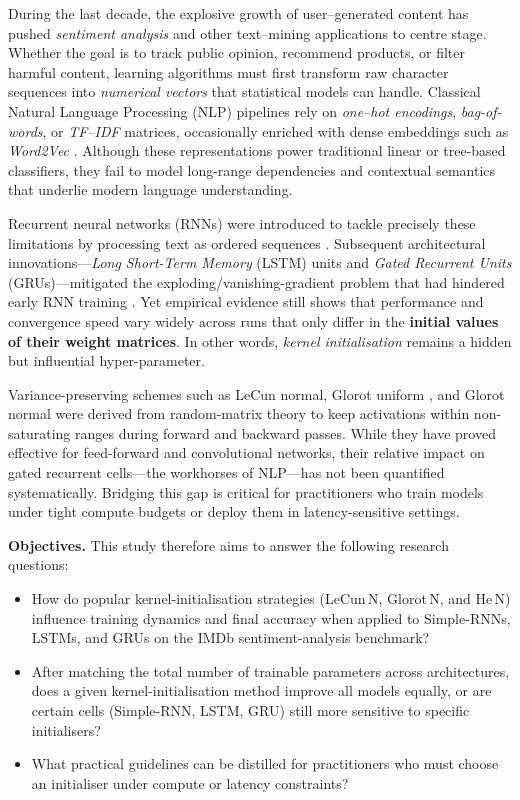 \documentclass[conference]{IEEEtran}
\begin{document}
During the last decade, the explosive growth of user–generated content has pushed
\emph{sentiment analysis} and other text–mining applications to centre stage.
Whether the goal is to track public opinion, recommend products, or filter
harmful content, learning algorithms must first transform raw character
sequences into \emph{numerical vectors} that statistical models can handle.
Classical Natural Language Processing (NLP) pipelines rely on
\emph{one–hot encodings}, \emph{bag-of-words}, or \emph{TF–IDF} matrices,
occasionally enriched with dense embeddings such as \emph{Word2Vec}
\cite{maas2011learning}. Although these representations power traditional linear or tree-based
classifiers, they fail to model long-range dependencies and contextual
semantics that underlie modern language understanding.

Recurrent neural networks (RNNs) were introduced to tackle precisely these
limitations by processing text as ordered sequences \cite{elman1990finding,rumelhart1986learning}.
Subsequent architectural innovations—\emph{Long Short-Term Memory} (LSTM) units
\cite{hochreiter1997long} and \emph{Gated Recurrent Units} (GRUs)—mitigated the
exploding/vanishing-gradient problem that had hindered early RNN training
\cite{bengio1994learning}. Yet empirical evidence still shows that performance and convergence
speed vary widely across runs that only differ in the \textbf{initial values of
their weight matrices}. In other words, \emph{kernel initialisation} remains a
hidden but influential hyper-parameter.

Variance-preserving schemes such as LeCun normal\cite{lecun1998efficient}, Glorot uniform \cite{glorot2010understanding}, and
Glorot normal \cite{glorot2010understanding} were derived from random-matrix theory to keep activations within
non-saturating ranges during forward and backward passes. While they have
proved effective for feed-forward and convolutional networks, their relative
impact on gated recurrent cells—the workhorses of NLP—has not been quantified
systematically. Bridging this gap is critical for practitioners who train
models under tight compute budgets or deploy them in latency-sensitive
settings.

\textbf{Objectives.}
This study therefore aims to answer the following research questions:

\begin{itemize}
  \item[Q1.] How do popular kernel-initialisation strategies (LeCun\,N,
        Glorot\,N, and He\,N) influence training dynamics and final
        accuracy when applied to Simple-RNNs, LSTMs, and GRUs on the IMDb
        sentiment-analysis benchmark?
  \item[Q2.] After matching the total number of trainable parameters across architectures, does a given kernel-initialisation method improve all models equally, or are certain cells (Simple-RNN, LSTM, GRU) still more sensitive to specific initialisers?
  \item[Q3.] What practical guidelines can be distilled for practitioners who
        must choose an initialiser under compute or latency constraints?
\end{itemize}
\end{document}
